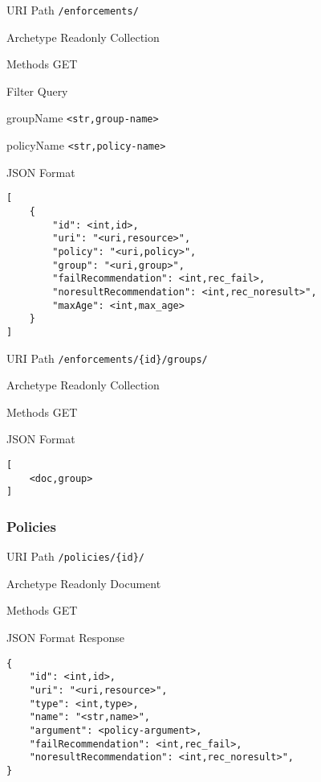 \documentclass[10pt,a4paper]{scrartcl}
\begin{document}
\begin{mdframed}[style=def]
\begin{description*}
	\item[URI Path] \texttt{/enforcements/}
	\item[Archetype] Readonly Collection
	\item[Methods] GET
	\item[Filter Query] \hfill
	\begin{description*}
		\item[groupName] \texttt{<str,group-name>}
		\item[policyName] \texttt{<str,policy-name>}
	\end{description*}	
	\item[JSON Format] \hfill
\begin{lstlisting}
[
	{
		"id": <int,id>,
		"uri": "<uri,resource>",
		"policy": "<uri,policy>",
		"group": "<uri,group>",
		"failRecommendation": <int,rec_fail>,
		"noresultRecommendation": <int,rec_noresult>",
		"maxAge": <int,max_age>
	}
]
\end{lstlisting}
\end{description*}
\end{mdframed}

\begin{mdframed}[style=def]
\begin{description*}
	\item[URI Path] \texttt{/enforcements/\{id\}/groups/}
	\item[Archetype] Readonly Collection
	\item[Methods] GET
	\item[JSON Format] \hfill
\begin{lstlisting}
[
	<doc,group>
]
\end{lstlisting}
\end{description*}
\end{mdframed}

\pagebreak
\subsubsection{Policies}

\begin{mdframed}[style=def]
\begin{description*}
	\item[URI Path] \texttt{/policies/\{id\}/}
	\item[Archetype] Readonly Document
	\item[Methods] GET
	\item[JSON Format Response] \hfill
\begin{lstlisting}
{
	"id": <int,id>,
	"uri": "<uri,resource>",
	"type": <int,type>,
	"name": "<str,name>",
	"argument": <policy-argument>,
	"failRecommendation": <int,rec_fail>,
	"noresultRecommendation": <int,rec_noresult>",
}
\end{lstlisting}
\end{description*}
\end{mdframed}
\end{document}
